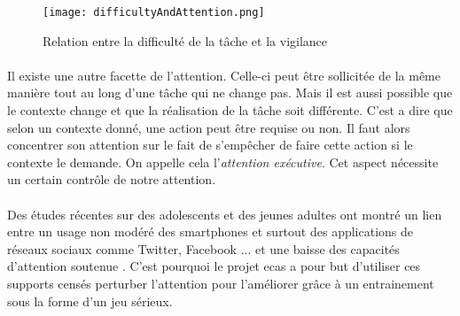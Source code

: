 \begin{figure}[H]
    \begin{center}
    \texttt{[image: difficultyAndAttention.png]}
    \end{center}
    \caption{Relation entre la difficulté de la tâche et la vigilance}
\label{DifficultyAndAttention}
\end{figure}

\paragraph{}Il existe une autre facette de l'attention. Celle-ci peut être sollicitée de la même manière tout au long d'une tâche qui ne change pas. Mais il est aussi possible que le
contexte change et que la réalisation de la tâche soit différente. C'est a dire que selon un contexte donné, une action peut être requise ou non. Il faut alors concentrer son
attention sur le fait de s'empêcher de faire cette action si le contexte le demande. On appelle cela l'\emph{attention exécutive}. Cet aspect nécessite un certain contrôle de notre
attention.


\paragraph{}Des études récentes sur des adolescents et des jeunes adultes ont montré un lien entre un usage non modéré des smartphones et surtout des applications de réseaux sociaux
comme Twitter, Facebook ... et une baisse des capacités d'attention soutenue \cite{ART01}. C'est pourquoi le projet \gls{ecas} a pour but d'utiliser ces supports censés perturber l'attention
pour l'améliorer grâce à un entrainement sous la forme d'un jeu sérieux.